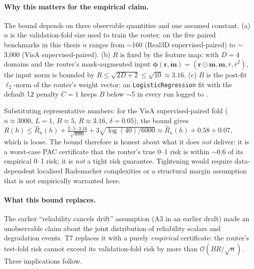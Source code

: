 \documentclass[11pt]{article}
\begin{document}
\paragraph{Why this matters for the empirical claim.}
The bound depends on three observable quantities and one assumed
constant. (a) $n$ is the validation-fold size used to train the
router; on the five paired benchmarks in this thesis $n$ ranges from
$\sim$160 (Real3D supervised-paired) to $\sim$3{,}000 (VisA
supervised-paired). (b) $R$ is fixed by the feature map: with
$D=4$ domains and the router's mask-augmented input
$\boldsymbol{\phi}(\mathbf{r},\mathbf{m})=
(\mathbf{r}\odot\mathbf{m},\mathbf{m},\bar r,\bar r^{2})$, the
input norm is bounded by $R\leq\sqrt{2D+2}\leq\sqrt{10}\approx 3.16$.
(c) $B$ is the post-fit $\ell_2$-norm of the router's weight vector;
an \texttt{LogisticRegression} fit with the default \texttt{l2}
penalty $C=1$ keeps $B$ below $\sim$5 in every run logged to
.

Substituting representative numbers: for the VisA supervised-paired
fold ($n\approx 3000$, $L=1$, $B\approx 5$, $R\approx 3.16$,
$\delta=0.05$), the bound gives
$R(h)\leq\widehat R_n(h)+\tfrac{2\cdot 5\cdot 3.16}{\sqrt{3000}}+
3\sqrt{\log(40)/6000}\approx\widehat R_n(h)+0.58+0.07$, which is
loose. The bound therefore is honest about what it does \emph{not}
deliver: it is a worst-case PAC certificate that the router's true
0--1 risk is within $\sim$0.6 of its empirical 0--1 risk; it is
\emph{not} a tight risk guarantee. Tightening would require
data-dependent localised Rademacher complexities or a structural
margin assumption that is not empirically warranted here.

\paragraph{What this bound replaces.}
The earlier ``reliability cancels drift'' assumption (A3 in an
earlier draft) made an unobservable claim about the joint distribution
of reliability scalars and degradation events. T7 replaces it with a
purely \emph{empirical} certificate: the router's test-fold risk
cannot exceed its validation-fold risk by more than
$\mathcal{O}(BR/\sqrt{n})$. Three implications follow.
\end{document}
